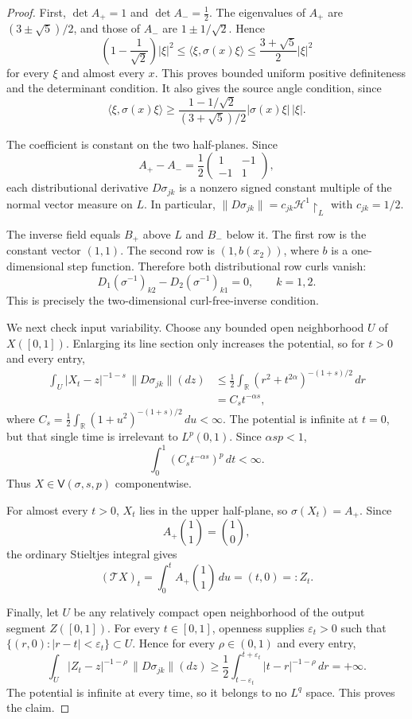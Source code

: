 \documentclass[11pt]{article}
\newcommand{\R}{\mathbb{R}}
\newcommand{\HH}{\mathcal{H}}
\newcommand{\V}{\mathsf{V}}
\newcommand{\Tmap}{\mathcal{T}}
\begin{document}
\begin{proof}
First, $\det A_+=1$ and $\det A_-=\frac12$.  The eigenvalues of $A_+$ are
$(3\pm\sqrt5)/2$, and those of $A_-$ are $1\pm1/\sqrt2$.  Hence
\[
 \left(1-\frac1{\sqrt2}\right)|\xi|^2
 \leq \langle \xi,\sigma(x)\xi\rangle
 \leq \frac{3+\sqrt5}{2}|\xi|^2
\]
for every $\xi$ and almost every $x$.  This proves bounded uniform positive
definiteness and the determinant condition.  It also gives the source angle
condition, since
\[
 \langle\xi,\sigma(x)\xi\rangle
 \geq \frac{1-1/\sqrt2}{(3+\sqrt5)/2}
       |\sigma(x)\xi|\,|\xi|.
\]

The coefficient is constant on the two half-planes.  Since
\[
 A_+-A_-=\frac12\begin{pmatrix}1&-1\\-1&1\end{pmatrix},
\]
each distributional derivative $D\sigma_{jk}$ is a nonzero signed constant
multiple of the normal vector measure on $L$.  In particular,
$\lVert D\sigma_{jk}\rVert=c_{jk}\HH^1\!\restriction_L$ with
$c_{jk}=1/2$.

The inverse field equals $B_+$ above $L$ and $B_-$ below it.  The first row is
the constant vector $(1,1)$.  The second row is $(1,b(x_2))$, where $b$ is a
one-dimensional step function.  Therefore both distributional row curls
vanish:
\[
 D_1(\sigma^{-1})_{k2}-D_2(\sigma^{-1})_{k1}=0,
 \qquad k=1,2.
\]
This is precisely the two-dimensional curl-free-inverse condition.

We next check input variability.  Choose any bounded open neighborhood $U$ of
$X([0,1])$.  Enlarging its line section only increases the potential, so for
$t>0$ and every entry,
\begin{align*}
 \int_U |X_t-z|^{-1-s}\,\lVert D\sigma_{jk}\rVert(dz)
 &\leq \frac12\int_{\R}(r^2+t^{2\alpha})^{-(1+s)/2}\,dr\\
 &=C_s t^{-\alpha s},
\end{align*}
where
$C_s=\frac12\int_{\R}(1+u^2)^{-(1+s)/2}\,du<\infty$.
The potential is infinite at $t=0$, but that single time is irrelevant to
$L^p(0,1)$.  Since $\alpha sp<1$,
\[
 \int_0^1 (C_s t^{-\alpha s})^p\,dt<\infty.
\]
Thus $X\in\V(\sigma,s,p)$ componentwise.

For almost every $t>0$, $X_t$ lies in the upper half-plane, so
$\sigma(X_t)=A_+$.  Since
\[
 A_+\binom11=\binom10,
\]
the ordinary Stieltjes integral gives
\[
 (\Tmap X)_t=\int_0^t A_+\binom11\,du=(t,0)=:Z_t.
\]

Finally, let $U$ be any relatively compact open neighborhood of the output
segment $Z([0,1])$.  For every $t\in[0,1]$, openness supplies
$\varepsilon_t>0$ such that
$\{(r,0):|r-t|<\varepsilon_t\}\subset U$.  Hence for every
$\rho\in(0,1)$ and every entry,
\[
 \int_U |Z_t-z|^{-1-\rho}\,\lVert D\sigma_{jk}\rVert(dz)
 \geq \frac12\int_{t-\varepsilon_t}^{t+\varepsilon_t}
 |t-r|^{-1-\rho}\,dr=+\infty.
\]
The potential is infinite at every time, so it belongs to no $L^q$ space.
This proves the claim.
\end{proof}
\end{document}
